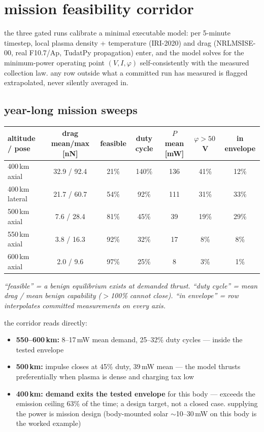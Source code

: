 \documentclass[11pt]{article}
\begin{document}
\section{mission feasibility corridor}

the three gated runs calibrate a minimal executable model: per 5-minute
timestep, local plasma density + temperature (IRI-2020) and drag (NRLMSISE-00,
real F10.7/Ap, TudatPy propagation) enter, and the model solves for the
minimum-power operating point $(V, I, \varphi)$ self-consistently with the
measured collection law.  any row outside what a committed run has measured is
flagged extrapolated, never silently averaged in.

\subsection{year-long mission sweeps}

\begin{center}\small
\begin{tabular}{lcccccc}
\toprule
altitude / pose & drag mean/max [nN] & feasible & duty cycle & $P$ mean [mW]
  & $\varphi{>}50$\,V & in envelope \\
\midrule
400\,km axial   & 32.9 / 92.4 & \textcolor{gfail}{21\%} & 140\% & 136 &
  41\% & 12\% \\
400\,km lateral & 21.7 / 60.7 & 54\% & 92\%  & 111 & 31\% & 33\% \\
500\,km axial   & 7.6 / 28.4  & 81\% & 45\%  & 39  & 19\% & 29\% \\
550\,km axial   & 3.8 / 16.3  & \textcolor{gpass}{92\%} & 32\% & 17 &
  8\% & 8\% \\
600\,km axial   & 2.0 / 9.6   & \textcolor{gpass}{97\%} & 25\% & 8 &
  3\% & 1\% \\
\bottomrule
\end{tabular}
\end{center}
{\small\itshape ``feasible'' = a benign equilibrium exists at demanded thrust.
``duty cycle'' = mean drag / mean benign capability ($>$100\% cannot close).
``in envelope'' = row interpolates committed measurements on every axis.}

\medskip
the corridor reads directly:
\begin{itemize}
  \item \textbf{550--600\,km:} 8--17\,mW mean demand, 25--32\% duty cycles
        --- inside the tested envelope
  \item \textbf{500\,km:} impulse closes at 45\% duty, 39\,mW mean --- the
        model thrusts preferentially when plasma is dense and charging tax
        low
  \item \textbf{400\,km: demand exits the tested envelope} for this body ---
        exceeds the emission ceiling 63\% of the time; a design target, not
        a closed case.  supplying the power is mission design (body-mounted
        solar $\sim$10--30\,mW on this body is the worked example)
\end{itemize}
\end{document}
